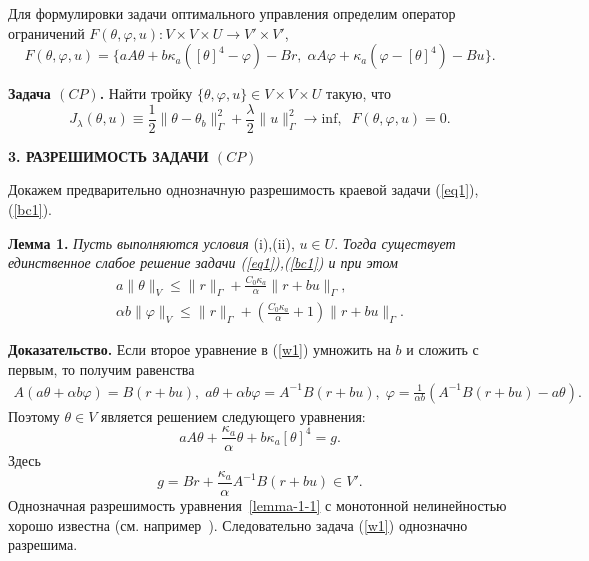 \documentclass[12pt]{article}
\begin{document}
    Для формулировки задачи оптимального управления определим оператор
    ограничений $F(\theta, \varphi, u) : V \times V \times U \rightarrow V' \times V'$,
    \[
        F(\theta, \varphi, u) = \{ aA\theta + b \kappa_a ( [\theta]^4- \varphi) - Br,\;
        \alpha A \varphi + \kappa_a (\varphi -[\theta]^4) - Bu\}.
    \]


    \textbf{Задача $(CP)$.} Найти тройку $\{\theta, \varphi, u \} \in V \times V \times U$
    такую, что
    \begin{equation}
        \label{CP}
        J_\lambda(\theta, u) \equiv \frac{1}{2}\|\theta -\theta_b\|^2_\Gamma
        + \frac{\lambda}{2}\|u\|^2_\Gamma \rightarrow \text{inf},\;\; F(\theta, \varphi, u)=0.
    \end{equation}





    \begin{center}
        \textbf{3. РАЗРЕШИМОСТЬ ЗАДАЧИ $(CP)$}
    \end{center}

    Докажем предварительно однозначную разрешимость краевой задачи (\ref{eq1}),(\ref{bc1}).

    \textbf{Лемма 1.}
    {\it
    Пусть выполняются условия} (i),(ii), $u\in U$. {\it Тогда
    существует единственное слабое решение задачи (\ref{eq1}),(\ref{bc1}) и при этом}
    \begin{equation}
        \label{E1}
        \begin{aligned}
            a\|\theta\|_V \leq \|r\|_\Gamma + \frac{C_0\kappa_a}{\alpha}\|r+bu\|_\Gamma, \\
            \alpha b \|\varphi\|_V \leq \|r\|_\Gamma +
            \left(\frac{C_0\kappa_a}{\alpha} + 1\right)\|r+bu\|_\Gamma.
        \end{aligned}
    \end{equation}

    {\bf Доказательство.}
    Если второе уравнение в (\ref{w1}) умножить на $b$ и сложить с первым, то получим равенства
    \begin{gather*}
        A \left( a \theta + \alpha b \varphi \right) = B(r + bu),\;
        a\theta + \alpha b \varphi = A^{-1}B(r + bu),\;
        \varphi = \frac{1}{\alpha b}(A^{-1}B(r +bu) - a\theta).
    \end{gather*}
    Поэтому $\theta \in V$ является решением следующего уравнения:
    \begin{equation}
        \label{lemma-1-1}
        a A \theta + \frac{\kappa_a}{\alpha} \theta + b\kappa_a [\theta]^4 = g.
    \end{equation}
    Здесь $$g = Br + \frac{\kappa_a}{\alpha}A^{-1}B(r+bu) \in V'.$$
    Однозначная разрешимость уравнения~\eqref{lemma-1-1} с монотонной нелинейностью
    хорошо известна (см.
    например~\cite{Kufner}).
    Следовательно задача (\ref{w1})
    однозначно разрешима.
\end{document}
